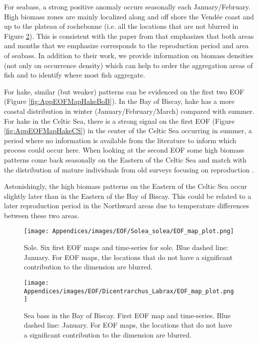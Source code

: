 For seabass, a strong positive anomaly occurs seasonally each January/February. High biomass zones are mainly localized along and off shore the Vendée coast and up to the plateau of rochebonne (i.e. all the locations that are not blurred in Figure \ref{fig:AppEOFMapSeaBass}). This is consistent with the paper from \textcite{dambrine2021characterising} that emphasizes that both areas and months that we emphasize corresponds to the reproduction period and area of seabass. In addition to their work, we provide information on biomass densities (not only on occurrence density) which can help to order the aggregation areas of fish and to identify where most fish aggregate.

For hake, similar (but weaker) patterns can be evidenced on the first two EOF (Figure    \ref{fig:AppEOFMapHakeBoB}). In the Bay of Biscay, hake has a more coastal distribution in winter (January/February/March) compared with summer. For hake in the Celtic Sea, there is a strong signal on the first EOF (Figure \ref{fig:AppEOFMapHakeCS}) in the center of the Celtic Sea occurring in summer, a period where no information is available from the literature to inform which process could occur here. When looking at the second EOF some high biomass patterns come back seasonally on the Eastern of the Celtic Sea and match with the distribution of mature individuals from old surveys focusing on reproduction \parencite{tidd2006species}.

Astonishingly, the high biomass patterns on the Eastern of the Celtic Sea occur slightly later than in the Eastern of the Bay of Biscay. This could be related to a later reproduction period in the Northward areas due to temperature differences between these two areas.

\newpage

\begin{figure}[H]
   \begin{center}
      \texttt{[image: Appendices/images/EOF/Solea\_solea/EOF\_map\_plot.png]}
   \end{center}
   \caption[Sole. Six first EOF maps and time-series for sole. Blue dashed line: January.]
   {Sole. Six first EOF maps and time-series for sole. Blue dashed line: January. For EOF maps, the locations that do not have a significant contribution to the dimension are blurred.}
   \label{fig:AppEOFMapSole}
\end{figure}

\begin{figure}[H]
   \begin{center}
      \texttt{[image: Appendices/images/EOF/Dicentrarchus\_Labrax/EOF\_map\_plot.png]}
   \end{center}
   \caption[Seabass in the Bay of Biscay. First EOF map and time-series. Blue dashed line: January.]
   {Sea bass in the Bay of Biscay. First EOF map and time-series. Blue dashed line: January. For EOF maps, the locations that do not have a significant contribution to the dimension are blurred.}
   \label{fig:AppEOFMapSeaBass}
\end{figure}

